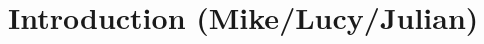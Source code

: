 \documentclass[../main.tex]{subfiles}
\begin{document}
\section{Introduction (Mike/Lucy/Julian)}
\label{sec:intro}








\end{document}
